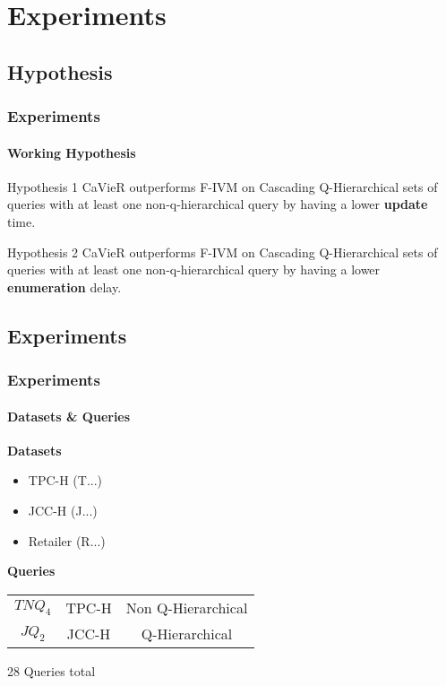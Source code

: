 \documentclass[
	11pt, %
]{beamer}
\begin{document}
\section{Experiments}
\subsection{Hypothesis}
\begin{frame}
	\frametitle{Experiments}
	\framesubtitle{Working Hypothesis}
	\begin{block}{Hypothesis 1 }\label{hyp:initialUpdate}
		CaVieR outperforms F-IVM on Cascading Q-Hierarchical sets of queries with at least one non-q-hierarchical query by having a lower \textbf{update} time.
	\end{block}
	
	\begin{block}{Hypothesis 2}\label{hyp:initialEnumeration}
		CaVieR outperforms F-IVM on Cascading Q-Hierarchical sets of queries with at least one non-q-hierarchical query by having a lower \textbf{enumeration} delay.
	\end{block}

\end{frame}

\subsection{Experiments}
\begin{frame}
	\frametitle{Experiments}
	\framesubtitle{Datasets \& Queries}
	\textbf{Datasets}
	\begin{itemize}
		\item TPC-H	  (T...)
		\item JCC-H   (J...)
		\item Retailer  (R...)
	\end{itemize}
	\vspace{1em}
	\textbf{Queries}\\
	\vspace{0.5em}
	\begin{tabular}{c|c|c}
		$TNQ_4$ & TPC-H & Non Q-Hierarchical \\
		  \addlinespace[0.5em]
		\hline
		  \addlinespace[0.5em]
		$JQ_2$ & JCC-H & Q-Hierarchical \\
	\end{tabular}
	
	\vspace{1em}
	28 Queries total
\end{frame}
\end{document}
